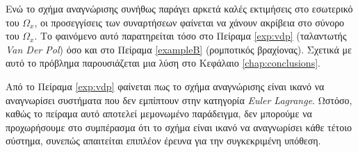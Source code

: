 \begin{remark}
	\label{remakr:border_eval}
	Ενώ το σχήμα αναγνώρισης συνήθως παράγει αρκετά καλές εκτιμήσεις στο εσωτερικό του $\Omega_x$, οι προσεγγίσεις των συναρτήσεων φαίνεται να χάνουν ακρίβεια στο σύνορο του $\Omega_x$. Το φαινόμενο αυτό παρατηρείται τόσο στο Πείραμα \ref{exp:vdp} (ταλαντωτής \textit{Van Der Pol}) όσο και στο Πείραμα \ref{exampleB} (ρομποτικός βραχίονας). Σχετικά με αυτό το πρόβλημα παρουσιάζεται μια λύση στο Κεφάλαιο \ref{chap:conclusions}. \\
\end{remark}

\begin{remark}
	Από το Πείραμα \ref{exp:vdp} φαίνεται πως το σχήμα αναγνώρισης είναι ικανό να αναγνωρίσει συστήματα που δεν εμπίπτουν στην κατηγορία \textit{Euler Lagrange}. Ωστόσο, καθώς το πείραμα αυτό αποτελεί μεμονωμένο παράδειγμα, δεν μπορούμε να προχωρήσουμε στο συμπέρασμα ότι το σχήμα είναι ικανό να αναγνωρίσει κάθε τέτοιο σύστημα, συνεπώς απαιτείται επιπλέον έρευνα για την συγκεκριμένη υπόθεση.
\end{remark}